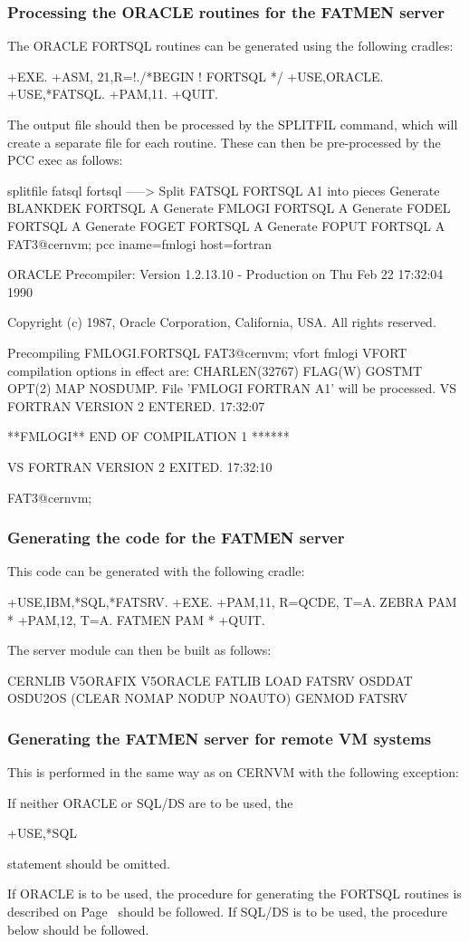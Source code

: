 \subsubsection{\protect\label{HORACLE}Processing the ORACLE routines for the 
FATMEN server}
The ORACLE
FORTSQL routines can be generated using the following cradles:
\begin{XMP}
+EXE.
+ASM, 21,R=!./*BEGIN ! FORTSQL */
+USE,ORACLE.
+USE,*FATSQL.
+PAM,11.
+QUIT.
\end{XMP}
The output file should then be processed by the SPLITFIL command,
which will create a separate file for each routine.
These can then be pre-processed by the PCC exec as follows:
\begin{XMP}
splitfile fatsql fortsql
-----> Split FATSQL FORTSQL A1 into pieces
Generate BLANKDEK FORTSQL A
Generate FMLOGI FORTSQL A
Generate FODEL FORTSQL A
Generate FOGET FORTSQL A
Generate FOPUT FORTSQL A
FAT3@cernvm;
pcc iname=fmlogi host=fortran
 
ORACLE Precompiler: Version 1.2.13.10 - Production on Thu Feb 22 17:32:04 1990
 
Copyright (c) 1987, Oracle Corporation, California, USA.  All rights reserved.
 
 
Precompiling FMLOGI.FORTSQL
FAT3@cernvm;
vfort fmlogi
VFORT compilation options in effect are: CHARLEN(32767) FLAG(W) GOSTMT OPT(2) 
MAP NOSDUMP.
File 'FMLOGI FORTRAN A1' will be processed.
VS FORTRAN VERSION 2 ENTERED.  17:32:07
 
**FMLOGI** END OF COMPILATION 1 ******
 
VS FORTRAN VERSION 2 EXITED.   17:32:10
 
FAT3@cernvm;
\end{XMP}
\subsubsection{Generating the code for the FATMEN server}
This code can be generated with the following cradle:
\begin{XMP}
+USE,IBM,*SQL,*FATSRV.
+EXE.
+PAM,11, R=QCDE, T=A.  ZEBRA PAM *
+PAM,12,  T=A. FATMEN PAM *
+QUIT.
\end{XMP}
The server module can then be built as follows:
\begin{XMP}
CERNLIB V5ORAFIX V5ORACLE FATLIB
LOAD FATSRV OSDDAT OSDU2OS (CLEAR NOMAP NODUP NOAUTO)
GENMOD FATSRV
\end{XMP}
\subsubsection{Generating the FATMEN server for remote VM systems}
This is performed in the same way as on CERNVM with the following
exception:
\begin{UL}
\item
If neither ORACLE or SQL/DS are to be used, the \begin{XMP}+USE,*SQL\end{XMP}
statement should be omitted.
\end{UL}
If ORACLE is to be used, the procedure for generating the FORTSQL
routines is described on Page~\pageref{HORACLE}
should be followed. If SQL/DS is to be used, the procedure
below should be followed.
